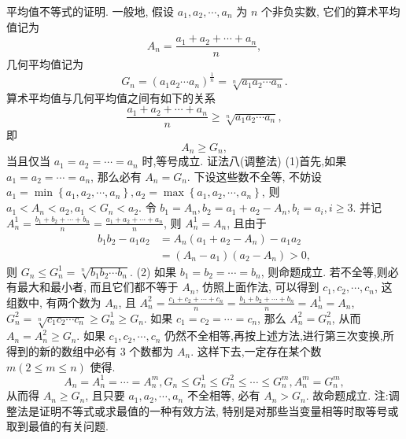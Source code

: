 平均值不等式的证明.
一般地, 假设 $a_1, a_2, \cdots, a_n$ 为 $n$ 个非负实数, 它们的算术平均值记为
$$
A_n=\frac{a_1+a_2+\cdots+a_n}{n},
$$
几何平均值记为
$$
G_n=\left(a_1 a_2 \cdots a_n\right)^{\frac{1}{n}}=\sqrt[n]{a_1 a_2 \cdots a_n} .
$$
算术平均值与几何平均值之间有如下的关系
$$
\frac{a_1+a_2+\cdots+a_n}{n} \geqslant \sqrt[n]{a_1 a_2 \cdots a_n},
$$
即
$$
A_n \geqslant G_n,
$$
当且仅当 $a_1=a_2=\cdots=a_n$ 时,等号成立.
证法八(调整法)
(1)首先,如果 $a_1=a_2=\cdots=a_n$, 那么必有 $A_n=G_n$. 下设这些数不全等, 不妨设 $a_1=\min \left\{a_1, a_2, \cdots, a_n\right\}, a_2=\max \left\{a_1, a_2, \cdots, a_n\right\}$, 则 $a_1< A_n<a_2, a_1<G_n<a_2$. 令 $b_1=A_n, b_2=a_1+a_2-A_n, b_i=a_i, i \geqslant 3$. 并记 $A_n^1=\frac{b_1+b_2+\cdots+b_n}{n}=\frac{a_1+a_2+\cdots+a_n}{n}$, 则 $A_n^1=A_n$, 且由于
$$
\begin{aligned}
b_1 b_2-a_1 a_2 & =A_n\left(a_1+a_2-A_n\right)-a_1 a_2 \\
& =\left(A_n-a_1\right)\left(a_2-A_n\right)>0,
\end{aligned}
$$
则 $G_n \leqslant G_n^1=\sqrt[n]{b_1 b_2 \cdots b_n}$.
(2) 如果 $b_1=b_2=\cdots=b_n$, 则命题成立.
若不全等,则必有最大和最小者, 而且它们都不等于 $A_n$, 仿照上面作法, 可以得到 $c_1, c_2, \cdots, c_n$, 这组数中, 有两个数为 $A_n$, 且 $A_n^2=\frac{c_1+c_2+\cdots+c_n}{n}=\frac{b_1+b_2+\cdots+b_n}{n}=A_n^1=A_n$, $G_n^2=\sqrt[n]{c_1 c_2 \cdots c_n} \geqslant G_n^1 \geqslant G_n$. 如果 $c_1=c_2=\cdots=c_n$, 那么 $A_n^2=G_n^2$, 从而 $A_n=A_n^2 \geqslant G_n$. 如果 $c_1, c_2, \cdots, c_n$ 仍然不全相等,再按上述方法,进行第三次变换,所得到的新的数组中必有 3 个数都为 $A_n$. 这样下去,一定存在某个数 $m(2 \leqslant m \leqslant n)$ 使得.
$$
A_n=A_n^1=\cdots=A_n^m, G_n \leqslant G_n^1 \leqslant G_n^2 \leqslant \cdots \leqslant G_n^m, A_n^m=G_n^m,
$$
从而得 $A_n \geqslant G_n$, 且只要 $a_1, a_2, \cdots, a_n$ 不全相等, 必有 $A_n>G_n$. 故命题成立.
注:调整法是证明不等式或求最值的一种有效方法, 特别是对那些当变量相等时取等号或取到最值的有关问题.



